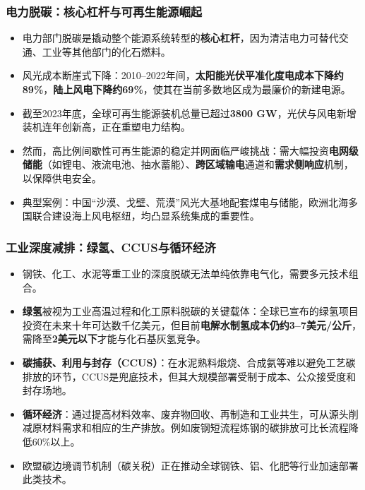 \documentclass[11pt]{beamer}
\begin{document}
\begin{frame}
\frametitle{电力脱碳：核心杠杆与可再生能源崛起}
\small
\begin{itemize}
  \item 电力部门脱碳是撬动整个能源系统转型的\textbf{核心杠杆}，因为清洁电力可替代交通、工业等其他部门的化石燃料。
  \item 风光成本断崖式下降：2010--2022年间，\textbf{太阳能光伏平准化度电成本下降约89\%}，\textbf{陆上风电下降约69\%}，使其在当前多数地区成为最廉价的新建电源。
  \item 截至2023年底，全球可再生能源装机总量已超过\textbf{3800 GW}，光伏与风电新增装机连年创新高，正在重塑电力结构。
  \item 然而，高比例间歇性可再生能源的稳定并网面临严峻挑战：需大幅投资\textbf{电网级储能}（如锂电、液流电池、抽水蓄能）、\textbf{跨区域输电}通道和\textbf{需求侧响应}机制，以保障供电安全。
  \item 典型案例：中国“沙漠、戈壁、荒漠”风光大基地配套煤电与储能，欧洲北海多国联合建设海上风电枢纽，均凸显系统集成的重要性。
\end{itemize}
\end{frame}

\begin{frame}
\frametitle{工业深度减排：绿氢、CCUS与循环经济}
\small
\begin{itemize}
  \item 钢铁、化工、水泥等重工业的深度脱碳无法单纯依靠电气化，需要多元技术组合。
  \item \textbf{绿氢}被视为工业高温过程和化工原料脱碳的关键载体：全球已宣布的绿氢项目投资在未来十年可达数千亿美元，但目前\textbf{电解水制氢成本仍约3--7美元/公斤}，需降至\textbf{2美元以下}才能与化石基灰氢竞争。
  \item \textbf{碳捕获、利用与封存（CCUS）}：在水泥熟料煅烧、合成氨等难以避免工艺碳排放的环节，CCUS是兜底技术，但其大规模部署受制于成本、公众接受度和封存场地。
  \item \textbf{循环经济}：通过提高材料效率、废弃物回收、再制造和工业共生，可从源头削减原材料需求和相应的生产排放。例如废钢短流程炼钢的碳排放可比长流程降低60\%以上。
  \item 欧盟碳边境调节机制（碳关税）正在推动全球钢铁、铝、化肥等行业加速部署此类技术。
\end{itemize}
\end{frame}
\end{document}
